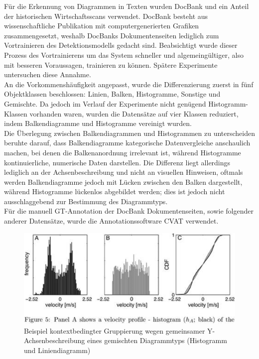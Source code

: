 Für die Erkennung von Diagrammen in Texten wurden DocBank \cite{li2020docbank} und ein Anteil der historischen Wirtschaftsscans verwendet. DocBank besteht aus wissenschaftliche Publikation mit computergenerierten Grafiken zusammengesetzt, weshalb DocBanks Dokumentenseiten lediglich zum Vortrainieren des Detektionsmodells gedacht sind. Beabsichtigt wurde dieser Prozess des Vortrainierens um das System schneller und algemeingültiger, also mit besseren Voraussagen, trainieren zu können. Spätere Experimente untersuchen diese Annahme.
\\
An die Vorkommenshäufigkeit angepasst, wurde die Differenzierung zuerst in fünf Objektklassen beschlossen: Linien, Balken, Histogramme, Sonstige und Gemischte. Da jedoch im Verlauf der Experimente nicht genügend Histogramm-Klassen vorhanden waren, wurden die Datensätze auf vier Klassen reduziert, indem Balkendiagramme und Histogramme vereinigt wurden.
\\
Die Überlegung zwischen Balkendiagrammen und Histogrammen zu unterscheiden beruhte darauf, dass Balkendiagramme kategorische Datenvergleiche anschaulich machen, bei denen die Balkenanordnung irrelevant ist, während Histogramme kontinuierliche, numerische Daten darstellen. Die Differenz liegt allerdings lediglich an der Achsenbeschreibung und nicht an visuellen Hinweisen, oftmals werden Balkendiagramme jedoch mit Lücken zwischen den Balken dargestellt, während Histogramme lückenlos abgebildet werden; dies ist jedoch nicht ausschlaggebend zur Bestimmung des Diagrammtyps.
\\
Für die manuell GT-Annotation der DocBank Dokumentenseiten, sowie folgender anderer Datensätze, wurde die Annotationssoftware CVAT \cite{CVAT_ai_Corporation_Computer_Vision_Annotation_2023} verwendet.

\begin{figure}[h!]
    \centering
    \captionsetup{width=.75\linewidth}
    \includegraphics[width=.75\textwidth]{Methodik/img/docbank_example.png}
    \caption{ Beispiel kontextbedingter Gruppierung wegen gemeinsamer Y-Achsenbeschreibung eines gemischten Diagrammtyps (Histogramm und Liniendiagramm)}
    \label{fig:docbank_example}
\end{figure}

